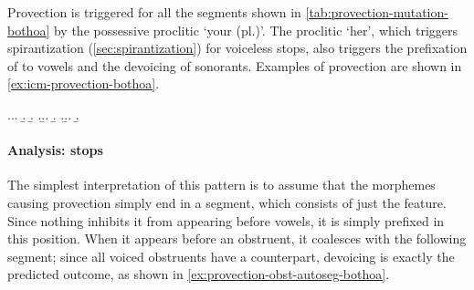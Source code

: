 \begin{table}[htp]
  \centering
{}
  \caption{The provective mutation in Bothoa Breton}
  \label{tab:provection-mutation-bothoa}
\end{table}

Provection is triggered for all the segments shown in \cref{tab:provection-mutation-bothoa} by the possessive proclitic \ipa{[o]} `your (pl.)'. The proclitic \ipa{[i]} `her', which triggers spirantization (\cref{sec:spirantization}) for voiceless stops, also triggers the prefixation of \ipa{[h]} to vowels and the devoicing of sonorants. Examples of provection are shown in \ref{ex:icm-provection-bothoa}.

\ex.\label{ex:icm-provection-bothoa}\a.\a.
\b.
\b.\mbi{[o ˈhmaːb̥]}
\z.\b.\a.
\b.
\z.\b.\a.
\b.

\paragraph{Analysis: stops}
\label{sec:analysis-7}

The simplest interpretation of this pattern is to assume that the morphemes causing provection simply end in a \ipa{[h]} segment, which consists of just the  feature. Since nothing inhibits it from appearing before vowels, it is simply prefixed in this position. When it appears before an obstruent, it coalesces with the following segment; since all voiced obstruents have a  counterpart, devoicing is exactly the predicted outcome, as shown in \cref{ex:provection-obst-autoseg-bothoa}.

